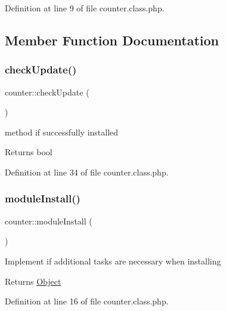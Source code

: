 Definition at line 9 of file counter.\+class.\+php.



\subsection{Member Function Documentation}
\mbox{\label{classcounter_a41683d96129e79d63ce63ccde0efa2f0}} 
\subsubsection{\texorpdfstring{check\+Update()}{checkUpdate()}}
{\footnotesize\ttfamily counter\+::check\+Update (\begin{DoxyParamCaption}{ }\end{DoxyParamCaption})}

method if successfully installed

\begin{DoxyReturn}{Returns}
bool 
\end{DoxyReturn}


Definition at line 34 of file counter.\+class.\+php.

\mbox{\label{classcounter_a05510fe21e12390a3cdee668b42cab5b}} 
\subsubsection{\texorpdfstring{module\+Install()}{moduleInstall()}}
{\footnotesize\ttfamily counter\+::module\+Install (\begin{DoxyParamCaption}{ }\end{DoxyParamCaption})}

Implement if additional tasks are necessary when installing \begin{DoxyReturn}{Returns}
\hyperlink{classObject}{Object} 
\end{DoxyReturn}


Definition at line 16 of file counter.\+class.\+php.

\mbox{\label{classcounter_a7c2e176fb177033a303aca925cddb046}} 
